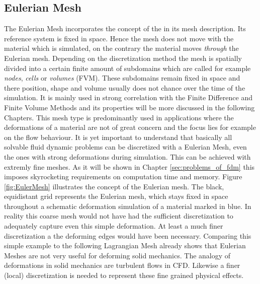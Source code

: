 \subsection{Eulerian Mesh}
\label{subsec:eulerian_mesh}
The Eulerian Mesh incorporates the concept of the  in its mesh description. Its reference system is fixed in space. Hence the mesh does not move
with the material which is simulated, on the contrary the material moves \emph{through} the Eulerian mesh. Depending on the discretization method the mesh is spatially divided into a certain finite amount of subdomains which are called for example \emph{nodes}, \emph{cells} or  \emph{volumes} (FVM). These subdomains remain fixed in space and there position, shape and volume usually does not chance over the time of the simulation. It is mainly used in strong correlation with the Finite Difference and Finite Volume Methods and its properties will be more discussed in the following Chapters. This mesh type is predominantly used in applications where the deformations of a material are not of great concern and the focus lies for example on the flow behaviour. It is yet important to understand that basically all solvable fluid dynamic problems can be discretized with a Eulerian Mesh, even the ones with strong deformations during simulation. This can be achieved with extremly fine meshes. As it will be shown in Chapter \ref{sec:problems_of_fdm} this imposes skyrocketing requirements on computation time and memory. Figure \ref{fig:EulerMesh} illustrates the concept of the Eulerian mesh.
The black, equidistant grid represents the Eulerian mesh, which stays fixed in space throughout a schematic deformation simulation of a material marked in blue. In reality
this coarse mesh would not have had the sufficient discretization to adequately capture even this simple deformation. At least a much finer discretization a the deforming edges would have been necessary. Comparing this simple example to the following Lagrangian Mesh already shows that Eulerian Meshes are not very useful for deforming solid mechanics. The analogy of deformations in solid mechanics are turbulent flows in CFD. Likewise a finer (local) discretization is needed to represent these fine grained physical effects.

